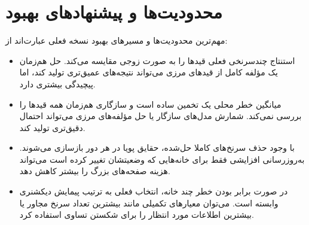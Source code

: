 \documentclass[10.5pt]{exam}
\begin{document}
\section{محدودیت‌ها و پیشنهادهای بهبود}
مهم‌ترین محدودیت‌ها و مسیرهای بهبود نسخه فعلی عبارت‌اند از:

\begin{itemize}
    \item استنتاج چندسرنخی فعلی قیدها را به صورت زوجی مقایسه می‌کند. حل هم‌زمان یک مؤلفه کامل از قیدهای مرزی می‌تواند نتیجه‌های عمیق‌تری تولید کند، اما پیچیدگی بیشتری دارد.
    \item میانگین خطر محلی یک تخمین ساده است و سازگاری هم‌زمان همه قیدها را بررسی نمی‌کند. شمارش مدل‌های سازگار یا حل مؤلفه‌های مرزی می‌تواند احتمال دقیق‌تری تولید کند.
    \item با وجود حذف سرنخ‌های کاملا حل‌شده، حقایق پویا در هر دور بازسازی می‌شوند. به‌روزرسانی افزایشی فقط برای خانه‌هایی که وضعیتشان تغییر کرده است می‌تواند هزینه صفحه‌های بزرگ را بیشتر کاهش دهد.
    \item در صورت برابر بودن خطر چند خانه، انتخاب فعلی به ترتیب پیمایش دیکشنری وابسته است. می‌توان معیارهای تکمیلی مانند بیشترین تعداد سرنخ مجاور یا بیشترین اطلاعات مورد انتظار را برای شکستن تساوی استفاده کرد.
\end{itemize}
\end{document}
